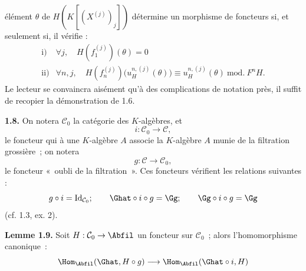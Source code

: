 élément \(\theta\) de \(H(K[(X^{(j)})_j])\) détermine un morphisme de foncteurs si, et seulement si, il vérifie :
\[
\begin{array}{ll}
\text{i)}& \forall j,\quad H(f_1^{(j)})(\theta)=0\\[0.3em]
\text{ii)}& \forall n,j,\quad
H(f_n^{(j)})\bigl(u_H^{n,(j)}(\theta)\bigr)
\equiv u_H^{n,(j)}(\theta)\ \mathrm{mod.}\ F^nH.
\end{array}
\]
Le lecteur se convaincra aisément qu'à des complications de notation près, il suffit de recopier la démonstration de 1.6.

\textbf{1.8.} On notera \(\mathcal C_0\) la catégorie des \(K\)-algèbres, et
\[
  i:\mathcal C_0\longrightarrow \mathcal C,
\]
le foncteur qui à une \(K\)-algèbre \(A\) associe la \(K\)-algèbre \(A\) munie de la filtration grossière~; on notera
\[
  g:\mathcal C\longrightarrow\mathcal C_0,
\]
le foncteur «~oubli de la filtration~». Ces foncteurs vérifient les relations suivantes :
\[
  g\circ i=\operatorname{Id}_{\mathcal C_0};\qquad
  \Ghat\circ i\circ g=\Gg;\qquad
  \Gg\circ i\circ g=\Gg
\]
(cf. 1.3, ex. 2).

\textbf{Lemme 1.9.} Soit \(H:\mathcal C_0\to\Abfil\) un foncteur sur \(\mathcal C_0\)~; alors l'homomorphisme canonique~:
\[
  \Hom_{\Abfil}(\Ghat,H\circ g)
  \longrightarrow
  \Hom_{\Abfil}(\Ghat\circ i,H)
\]
